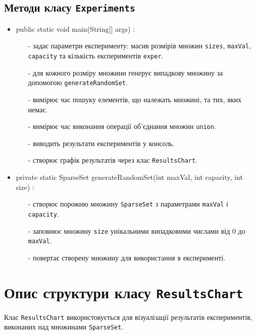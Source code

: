 \documentclass[12pt,a4paper]{article}
\begin{document}
\subsection{Методи класу \texttt{Experiments}}
\begin{itemize}
    \item public static void main(String[] args) :
    \begin{itemize}
        \item[-] задає параметри експерименту: масив розмірів множин \texttt{sizes}, \texttt{maxVal},  \texttt{capacity} та кількість експериментів \texttt{exper}.  
        \item[-] для кожного розміру множини генерує випадкову множину за допомогою \texttt{generateRandomSet}.  
        \item[-] вимірює час пошуку елементів, що належать множині, та тих, яких немає.  
        \item[-] вимірює час виконання операції об'єднання множин \texttt{union}.  
        \item[-] виводить результати експериментів у консоль.  
        \item[-] створює графік результатів через клас \texttt{ResultsChart}.
    \end{itemize}

    \item private static SparseSet generateRandomSet(int maxVal, int capacity, int size) :
    \begin{itemize}
        \item[-] створює порожню множину \texttt{SparseSet} з параметрами \texttt{maxVal} і \texttt{capacity}.  
        \item[-] заповнює множину \texttt{size} унікальними випадковими числами від 0 до \texttt{maxVal}.  
        \item[-] повертає створену множину для використання в експерименті.
    \end{itemize}
\end{itemize}

\section{Опис структури класу \texttt{ResultsChart }} 
Клас \texttt{ResultsChart} використовується для візуалізації результатів експериментів, виконаних над множинами \texttt{SparseSet}.  
\end{document}
